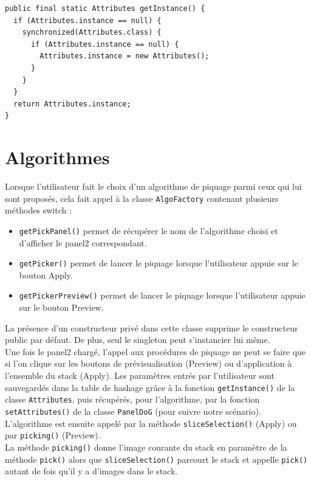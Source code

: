 \begin{small}
\begin{lstlisting}
public final static Attributes getInstance() {
  if (Attributes.instance == null) {
    synchronized(Attributes.class) {
      if (Attributes.instance == null) {
        Attributes.instance = new Attributes();
      }
    }
  }
  return Attributes.instance;
}
\end{lstlisting}
\end{small}	

\section{Algorithmes}

Lorsque l'utilisateur fait le choix d'un algorithme de piquage parmi ceux qui lui sont proposés, cela fait appel à la classe \texttt{AlgoFactory} contenant plusieurs méthodes switch :
\begin{itemize}
\item \texttt{getPickPanel()} permet de récupérer le nom de l'algorithme choisi et d'afficher le panel2 correspondant.
\item \texttt{getPicker()} permet de lancer le piquage lorsque l'utilisateur appuie sur le bouton Apply.
\item \texttt{getPickerPreview()} permet de lancer le piquage lorsque l'utilisateur appuie sur le bouton Preview.
\end{itemize}

La présence d'un constructeur privé dans cette classe supprime le constructeur public par défaut. De plus, seul le singleton peut s'instancier lui même. \\

Une fois le panel2 chargé, l'appel aux procédures de piquage ne peut se faire que si l'on clique sur les boutons de prévisualisation (Preview) ou d'application à l'ensemble du stack (Apply). Les paramètres entrés par l'utilisateur sont sauvegardés dans la table de hashage grâce à la fonction \texttt{getInstance()} de la classe \texttt{Attributes}, puis récupérés, pour l'algorithme, par la fonction \texttt{setAttributes()} de la classe \texttt{PanelDoG} (pour suivre notre scénario). L'algorithme est ensuite appelé par la méthode \texttt{sliceSelection()} (Apply) ou par \texttt{picking()} (Preview). \\

La méthode \texttt{picking()} donne l'image courante du stack en paramètre de la méthode \texttt{pick()} alors que \texttt{sliceSelection()} parcourt le stack et appelle \texttt{pick()} autant de fois qu'il y a d'images dans le stack. \\

